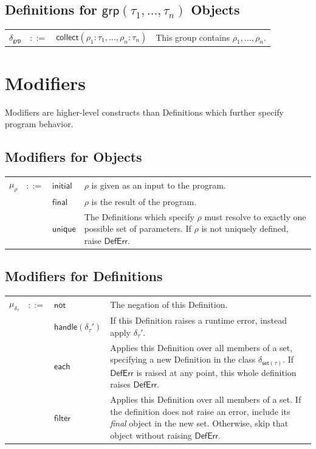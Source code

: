 \documentclass[twoside,11pt]{report}
\begin{document}
\subsection{Definitions for $\mathsf{grp}(\tau_1, \dots , \tau_n)$ Objects}
\label{subsec:def-grp}

\begin{tabularx}{\textwidth}{l l l X}
$\delta_{\mathsf{grp}}$ & $::=$ & $\mathsf{collect}(\rho_1 : \tau_1, \dots, \rho_n : \tau_n)$ & This group contains $\rho_1, \dots, \rho_n$.
\end{tabularx}


\section{Modifiers}
\label{sec:mods}

Modifiers are higher-level constructs than Definitions which further specify program behavior.

\subsection{Modifiers for Objects}
\label{subsec:mods-obj}

\begin{tabularx}{\textwidth}{l l l X}
$\mu_{\rho}$ & $::=$ & $\mathsf{initial}$ & $\rho$ is given as an input to the program. \\
 & & $\mathsf{final}$ & $\rho$ is the result of the program. \\
 & & $\mathsf{unique}$ & The Definitions which specify $\rho$ must resolve to exactly one possible set of parameters. If $\rho$ is not uniquely defined, raise $\mathsf{DefErr}$.
\end{tabularx}

\subsection{Modifiers for Definitions}
\label{subsec:mods-defs}

\begin{tabularx}{\textwidth}{l l l X}
$\mu_{\delta_\tau}$ & $::=$ & $\mathsf{not}$ & The negation of this Definition. \\
 & & $\mathsf{handle}(\delta_\tau')$ & If this Definition raises a runtime error, instead apply $\delta_\tau'$. \\
 & & $\mathsf{each}$ & Applies this Definition over all members of a set, specifying a new Definition in the class $\delta_{\mathsf{set}(\tau)}$. If $\mathsf{DefErr}$ is raised at any point, this whole definition raises $\mathsf{DefErr}$. \\
 & & $\mathsf{filter}$ & Applies this Definition over all members of a set. If the definition does not raise an error, include its {\it final} object in the new set. Otherwise, skip that object without raising $\mathsf{DefErr}$. \\
\end{tabularx}
\end{document}
